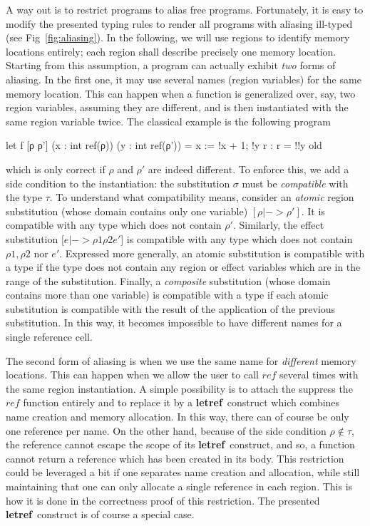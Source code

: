 \documentclass[a4paper]{llncs}
\newcommand{\letml}{{\bf let}}
\newcommand{\refml}{{\bf ref}}
\begin{document}
A way out is to restrict programs to alias free programs. Fortunately, it is
easy to modify the presented typing rules to render all programs with aliasing
ill-typed (see Fig~\ref{fig:aliasing}). In the following, we will use regions
to identify memory locations entirely; each region shall describe precisely
one memory location. Starting from this assumption, a program can actually
exhibit {\em two} forms of aliasing. In the first one, it may use several
names (region variables) for the same memory location. This can happen when a
function is generalized over, say, two region variables, assuming they are
different, and is then instantiated with the same region variable twice. The
classical example is the following program
\begin{who}
  let f [ρ ρ'] (x : int ref(ρ)) (y : int ref(ρ')) =
  { }
  x := !x + 1;
  !y
  { r : r = !!y old }
\end{who}
which is only correct if $ ρ $ and $ ρ' $ are indeed different. To enforce
this, we add a side condition to the instantiation: the substitution $σ$ must
be {\em compatible} with the type $τ$. To understand what compatibility means,
consider an {\em atomic} region substitution (whose domain contains only one
variable) $[ρ|->ρ']$. It is compatible with any type which does not contain
$ρ'$. Similarly, the effect substitution $[e|-> ρ1  ρ2 e'$] is compatible with
any type which does not contain $ ρ1 , ρ2 $ nor $e'$.  Expressed more
generally, an atomic substitution is compatible with a type if the type does
not contain any region or effect variables which are in the range of the
substitution. Finally, a {\em composite} substitution (whose domain contains more
than one variable) is compatible
with a type if each atomic substitution is compatible with the result of the
application of the previous substitution. In this way, it becomes impossible
to have different names for a single reference cell.

The second form of aliasing is when we use the same name for {\em different}
memory locations. This can happen when we allow the user to call $ref$ several
times with the same region instantiation. A simple possibility is to attach
the suppress the $ref$ function entirely and to replace it by a \letml\refml\ 
construct which combines name creation and memory allocation. In this way,
there can of course be only one reference per name. On the other hand, because
of the side condition $ρ\notin τ$, the reference cannot escape the scope of
its \letml\refml\ construct, and so, a function cannot return a reference
which has been created in its body. This restriction could be leveraged a bit if
one separates name creation and allocation, while still maintaining that one
can only allocate a single reference in each region. This is how it is done in
the correctness proof of this restriction. The presented \letml\refml\
construct is of course a special case.
\end{document}

